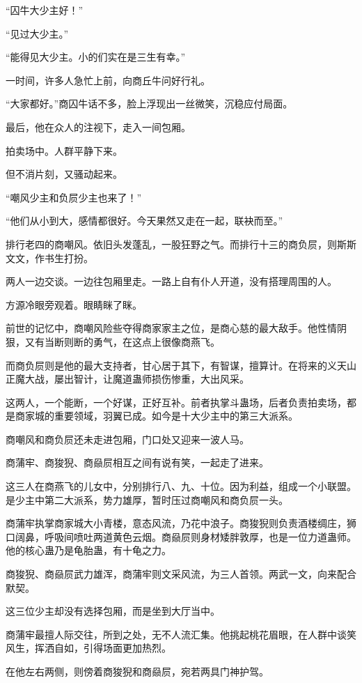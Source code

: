\begin{this_body}
“囚牛大少主好！”

“见过大少主。”

“能得见大少主。小的们实在是三生有幸。”

一时间，许多人急忙上前，向商丘牛问好行礼。

“大家都好。”商囚牛话不多，脸上浮现出一丝微笑，沉稳应付局面。

最后，他在众人的注视下，走入一间包厢。

拍卖场中。人群平静下来。

但不消片刻，又骚动起来。

“嘲风少主和负屃少主也来了！”

“他们从小到大，感情都很好。今天果然又走在一起，联袂而至。”

排行老四的商嘲风。依旧头发蓬乱，一股狂野之气。而排行十三的商负屃，则斯斯文文，作书生打扮。

两人一边交谈。一边往包厢里走。一路上自有仆人开道，没有搭理周围的人。

方源冷眼旁观着。眼睛眯了眯。

前世的记忆中，商嘲风险些夺得商家家主之位，是商心慈的最大敌手。他性情阴狠，又有当断则断的勇气，在这点上很像商燕飞。

而商负屃则是他的最大支持者，甘心居于其下，有智谋，擅算计。在将来的义天山正魔大战，屡出智计，让魔道蛊师损伤惨重，大出风采。

这两人，一个能断，一个好谋，正好互补。前者执掌斗蛊场，后者负责拍卖场，都是商家城的重要领域，羽翼已成。如今是十大少主中的第三大派系。

商嘲风和商负屃还未走进包厢，门口处又迎来一波人马。

商蒲牢、商狻猊、商赑屃相互之间有说有笑，一起走了进来。

这三人在商燕飞的儿女中，分别排行八、九、十位。因为利益，组成一个小联盟。是少主中第二大派系，势力雄厚，暂时压过商嘲风和商负屃一头。

商蒲牢执掌商家城大小青楼，意态风流，乃花中浪子。商狻猊则负责酒楼绸庄，狮口阔鼻，呼吸间喷吐两道黄色云烟。商赑屃则身材矮胖敦厚，也是一位力道蛊师。他的核心蛊乃是龟胎蛊，有十龟之力。

商狻猊、商赑屃武力雄浑，商蒲牢则文采风流，为三人首领。两武一文，向来配合默契。

这三位少主却没有选择包厢，而是坐到大厅当中。

商蒲牢最擅人际交往，所到之处，无不人流汇集。他挑起桃花眉眼，在人群中谈笑风生，挥洒自如，引得场面更加热烈。

在他左右两侧，则傍着商狻猊和商赑屃，宛若两具门神护驾。


\end{this_body}
